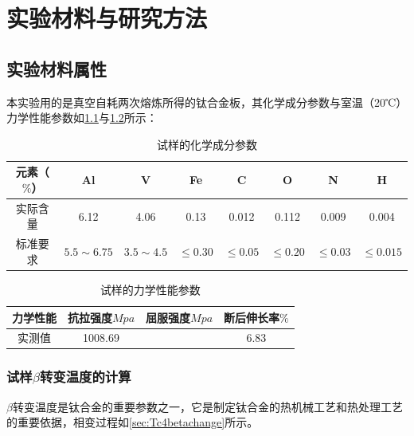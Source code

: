 \chapter{实验材料与研究方法}

\section{实验材料属性}
本实验用的是真空自耗两次熔炼所得的钛合金板，其化学成分参数与室温（20℃）力学性能参数如\ref{sec:mytc4chem}与\ref{sec:mytc4machin}所示：
\begin{table}[htbp]
	\centering
	\caption{试样的化学成分参数}
	\label{sec:mytc4chem}
	\begin{tabular}{cccccccc}
		\toprule
		元素（$ \% $） & Al & V &Fe &C& O& N &H \\ \midrule
		实际含量 & 6.12&4.06 &0.13 &0.012&0.112&0.009&0.004  \\
		标准要求 &$ 5.5\sim 6.75 $ & $ 3.5\sim 4.5 $&$ \le 0.30 $ & $ \le 0.05 $&$ \le 0.20 $&$ \le 0.03$ &$ \le 0.015 $ \\ \bottomrule
	\end{tabular}
\end{table}
\begin{table}[htbp]
	\centering
	\caption{试样的力学性能参数}
	\label{sec:mytc4machin}
	\begin{tabular}{cccc}
		\toprule
		力学性能& 抗拉强度$Mpa  $& 屈服强度$ Mpa $&断后伸长率$ \% $\\ \midrule
		实测值 & 1008.69 & & 6.83\\ \bottomrule
	\end{tabular}
\end{table}

%

\subsection{试样$\beta$转变温度的计算}
$\beta$转变温度是钛合金的重要参数之一，它是制定钛合金的热机械工艺和热处理工艺的重要依据，相变过程如\ref{sec:Tc4betachange}所示。

